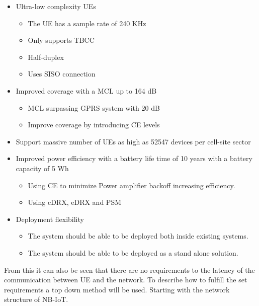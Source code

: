 \begin{itemize}
\item Ultra-low complexity \gls{UE}s
	\begin{itemize}
	\item The \gls{UE} has a sample rate of 240 KHz
	\item Only supports \gls{TBCC}
	\item Half-duplex
	\item Uses \gls{SISO} connection
	\end{itemize}
\item Improved coverage with a \gls{MCL} up to 164 dB
	\begin{itemize}
	\item \gls{MCL} surpassing \gls{GPRS} system with 20 dB
	\item Improve coverage by introducing \gls{CE} levels 
	\end{itemize}
\item Support massive number of \gls{UE}s as high as 52547 devices per cell-site sector
\item Improved power efficiency with a battery life time of 10 years with a battery capacity of 5 Wh
	\begin{itemize}
	\item Using \gls{CE} to minimize Power amplifier backoff increasing efficiency.
	\item Using \gls{cDRX}, \gls{eDRX} and \gls{PSM} 
	\end{itemize}
\item Deployment flexibility
	\begin{itemize}
	\item The system should be able to be deployed both inside existing systems.
	\item The system should be able to be deployed as a stand alone solution.
	\end{itemize}
\end{itemize}

From this it can also be seen that there are no requirements to the latency of the communication between \gls{UE} and the network. To describe how to fulfill the set requirements a top down method will be used. Starting with the network structure of \gls{NB-IoT}.




